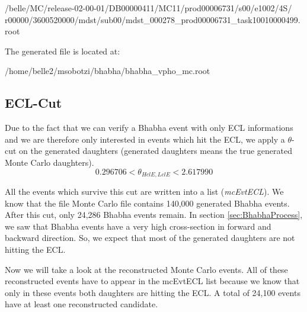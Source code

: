 \documentclass[a4paper,11pt,twosided,final,german,openbib,pdftex,listof=totoc,bibliography=totoc]{scrbook}
\begin{document}
/belle/MC/release-02-00-01/DB00000411/MC11/prod00006731/s00/e1002/4S/
r00000/3600520000/mdst/sub00/mdst\_000278\_prod00006731\_task10010000499.root
\newline

The generated file is located at:

 /home/belle2/msobotzi/bhabha/bhabha\_vpho\_mc.root
\newline


\subsection{ECL-Cut}

Due to the fact that we can verify a Bhabha event with only ECL informations and we are therefore only interested in events which hit the ECL, we apply a $\theta$-cut on the generated daughters (generated daughters means the true generated Monte Carlo daughters). 
\begin{equation}
	0.296706 < \theta_{HclE,LclE} < 2.617990
\end{equation}

All the events which survive this cut are written into a list (\textit{mcEvtECL}). We know that the file Monte Carlo file contains 140,000 generated Bhabha events. After this cut, only 24,286 Bhabha events remain.
In section \ref{sec:BhabhaProcess}, we saw that Bhabha events have a very high cross-section in forward and backward  direction. So, we expect that most of the generated daughters are not hitting the ECL. 
\newline





Now we will take a look at the reconstructed Monte Carlo events. All of these reconstructed events have to appear in the mcEvtECL list because we know that only in these events both daughters are hitting the ECL. A total of 24,100 events have at least one reconstructed candidate.
\end{document}

